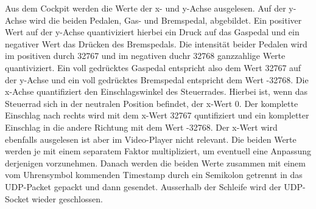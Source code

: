 Aus dem Cockpit werden die Werte der x- und y-Achse ausgelesen. Auf der y-Achse wird die beiden Pedalen, Gas- und Bremspedal, abgebildet. Ein positiver Wert auf der y-Achse quantiviziert hierbei ein Druck auf das Gaspedal und ein negativer Wert das Drücken des Bremspedals. Die intensität beider Pedalen wird im positiven durch 32767 und im negativen duchr 32768 ganzzahlige Werte quantiviziert. Ein voll gedrücktes Gaspedal entspricht also dem Wert 32767 auf der y-Achse und ein voll gedrücktes Bremspedal entspricht dem Wert -32768. Die x-Achse quantifiziert den Einschlagswinkel des Steuerrades. Hierbei ist, wenn das Steuerrad sich in der neutralen Position befindet, der x-Wert 0. Der komplette Einschlag nach rechts wird mit dem x-Wert 32767 quntifiziert und ein kompletter Einschlag in die andere Richtung mit dem Wert -32768. Der x-Wert wird ebenfalls ausgelesen ist aber im Video-Player nicht relevant. Die beiden Werte werden je mit einem separatem Faktor multipliziert, um eventuell eine Anpassung derjenigen vorzunehmen. Danach werden die beiden Werte zusammen mit einem vom Uhrensymbol kommenden Timestamp durch ein Semikolon getrennt in das UDP-Packet gepackt und dann gesendet. Ausserhalb der Schleife wird der UDP-Socket wieder geschlossen.

